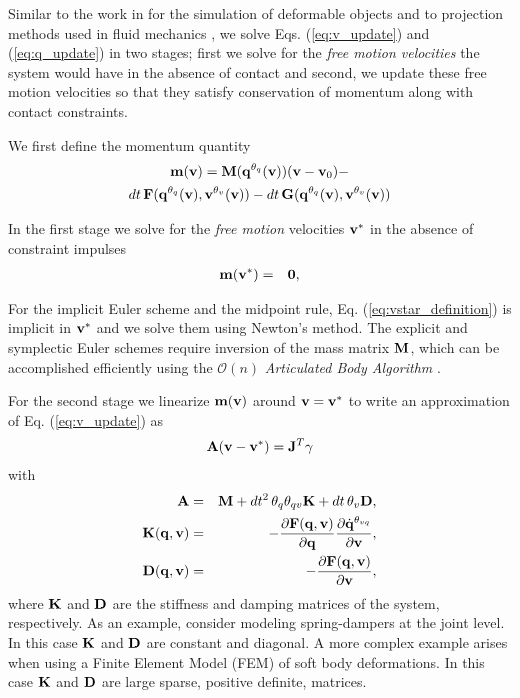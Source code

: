 Similar to the work in \cite{bib:duriez2005realistic} for the simulation of
deformable objects and to projection methods used in fluid mechanics
\cite{bib::bell1991efficient}, we solve Eqs. (\ref{eq:v_update}) and
(\ref{eq:q_update}) in two stages; first we solve for the \emph{free motion
velocities} the system would have in the absence of contact and second, we
update these free motion velocities so that they satisfy conservation of
momentum along with contact constraints.

We first define the momentum quantity
\begin{multline}
	\mf{m}(\mf{v}) =
	\mf{M}(\mf{q}^{\theta_{q}}(\mf{v}))(\mf{v}-\mf{v}_0) -\\
	dt\,\mf{F}(\mf{q}^{\theta_{q}}(\mf{v}), \mf{v}^{\theta_v}(\mf{v}))-
	dt\,\mf{G}(\mf{q}^{\theta_{q}}(\mf{v}), \mf{v}^{\theta_v}(\mf{v}))
	\label{eq:m_definition}
\end{multline}

In the first stage we solve for the
\textit{free motion} velocities ${\mathbf{v}}^*$ in the absence of constraint impulses
\begin{eqnarray}
	\mf{m}(\mf{v}^*) &=& \mf{0},
	\label{eq:vstar_definition}
\end{eqnarray}

For the implicit Euler scheme and the midpoint rule, Eq.
(\ref{eq:vstar_definition}) is implicit in ${\mathbf{v}}^*$ and we solve them using
Newton's method. The explicit and symplectic Euler schemes require inversion of
the mass matrix ${\mathbf{M}}$, which can be accomplished efficiently using the
$\mathcal{O}(n)$
\emph{Articulated Body Algorithm}
\cite{bib:featherstone2008_rigid_body_dynamics_algorithms}.

For the second stage we linearize ${\mathbf{m}}({\mathbf{v}})$ around ${\mathbf{v}} = {\mathbf{v}}^*$ to write an approximation of Eq. (\ref{eq:v_update}) as
\begin{eqnarray}
	\mf{A}(\mf{v}-\mf{v}^*)= \mf{J}^T\mf{\gamma}
	\label{eq:momentum_linearized}
\end{eqnarray}
with
\begin{eqnarray}
	\mf{A}&=&\mf{M}+dt^2\,\theta_q\theta_{qv}\mf{K}+dt\,\theta_v\mf{D},
	\label{eq:expression_for_A}\\
	\mf{K}(\mf{q}, \mf{v})&=&-\frac{\partial \mf{F}(\mf{q}, \mf{v})}{\partial
	\mf{q}}\frac{\partial\dot{\mf{q}}^{\theta_{vq}}}{\partial\mf{v}},
	\label{eq:stiffness_matrix}\\
	\mf{D}(\mf{q}, \mf{v})&=&-\frac{\partial \mf{F}(\mf{q}, \mf{v})}{\partial
	\mf{v}},
	\label{eq:dissipation_matrix}
\end{eqnarray}
where ${\mathbf{K}}$ and ${\mathbf{D}}$ are the stiffness and damping matrices of the
system, respectively. As an example, consider modeling spring-dampers at the
joint level. In this case ${\mathbf{K}}$ and ${\mathbf{D}}$ are constant and diagonal. A
more complex example arises when using a Finite Element Model (FEM) of soft body
deformations. In this case ${\mathbf{K}}$ and ${\mathbf{D}}$ are large sparse, positive
definite, matrices.

